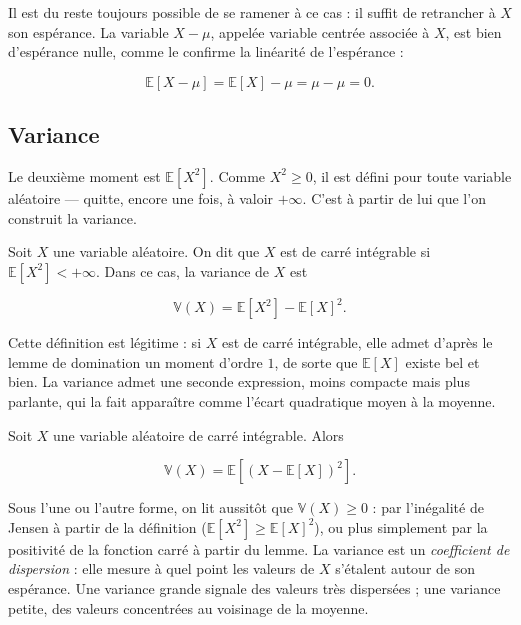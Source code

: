 Il est du reste toujours possible de se ramener à ce cas : il suffit de retrancher à $X$ son espérance. La variable $X - \mu$, appelée variable centrée associée à $X$, est bien d'espérance nulle, comme le confirme la linéarité de l'espérance :

$$
\mathbb{E}[X - \mu] = \mathbb{E}[X] - \mu = \mu - \mu = 0.
$$

\subsection{Variance}

Le deuxième moment est $\mathbb{E}[X^2]$. Comme $X^2 \geq 0$, il est défini pour toute variable aléatoire — quitte, encore une fois, à valoir $+\infty$. C'est à partir de lui que l'on construit la variance.

\medskip

\begin{mdframed}
\begin{definition}
Soit $X$ une variable aléatoire. On dit que $X$ est de carré intégrable si $\mathbb{E}[X^2] < +\infty$. Dans ce cas, la variance de $X$ est

$$
\mathbb{V}(X) = \mathbb{E}[X^2] - \mathbb{E}[X]^2.
$$
\end{definition}
\end{mdframed}

Cette définition est légitime : si $X$ est de carré intégrable, elle admet d'après le lemme de domination un moment d'ordre $1$, de sorte que $\mathbb{E}[X]$ existe bel et bien. La variance admet une seconde expression, moins compacte mais plus parlante, qui la fait apparaître comme l'écart quadratique moyen à la moyenne.

\medskip

\begin{mdframed}
\begin{lemme}
Soit $X$ une variable aléatoire de carré intégrable. Alors

$$
\mathbb{V}(X) = \mathbb{E}[(X - \mathbb{E}[X])^2].
$$
\end{lemme}
\end{mdframed}

Sous l'une ou l'autre forme, on lit aussitôt que $\mathbb{V}(X) \geq 0$ : par l'inégalité de Jensen à partir de la définition ($\mathbb{E}[X^2] \geq \mathbb{E}[X]^2$), ou plus simplement par la positivité de la fonction carré à partir du lemme. La variance est un \emph{coefficient de dispersion} : elle mesure à quel point les valeurs de $X$ s'étalent autour de son espérance. Une variance grande signale des valeurs très dispersées ; une variance petite, des valeurs concentrées au voisinage de la moyenne.

